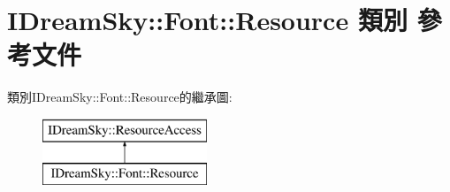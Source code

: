 \hypertarget{class_i_dream_sky_1_1_font_1_1_resource}{}\section{I\+Dream\+Sky\+:\+:Font\+:\+:Resource 類別 參考文件}
\label{class_i_dream_sky_1_1_font_1_1_resource}
類別\+I\+Dream\+Sky\+:\+:Font\+:\+:Resource的繼承圖\+:\begin{figure}[H]
\begin{center}
\leavevmode
\includegraphics[height=2.000000cm]{class_i_dream_sky_1_1_font_1_1_resource}
\end{center}
\end{figure}

